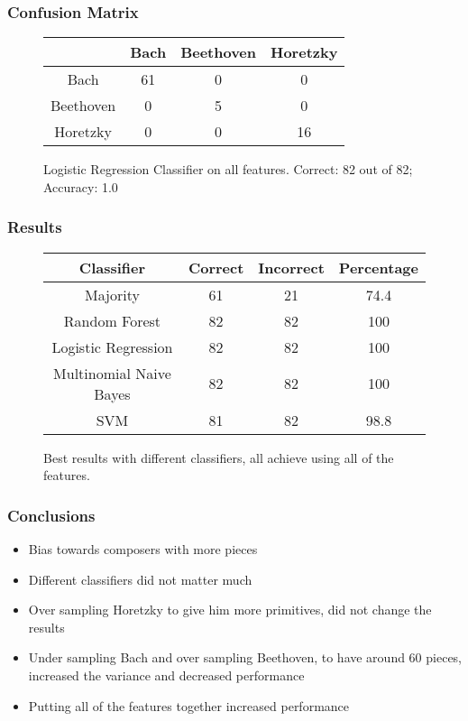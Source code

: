 \documentclass{beamer}
\begin{document}
\begin{frame}
  \frametitle{Confusion Matrix}
  \begin{figure}[!t]
    \begin{center}
      \begin{tabular}{c | c c c}
        & Bach  & Beethoven & Horetzky \\
        \hline
        Bach & 61 & 0 & 0 \\
        Beethoven & 0  & 5 & 0 \\
        Horetzky & 0  & 0 & 16
      \end{tabular}
    \end{center}
    \caption{
      Logistic Regression Classifier on all features.
      Correct: 82 out of 82;
      Accuracy: 1.0
    }
  \end{figure}
\end{frame}


\begin{frame}
  \frametitle{Results}
  \begin{figure}
    \begin{center}
      \begin{tabular}{c || c | c | c }
        Classifier & Correct & Incorrect & Percentage\\
        \hline
        Majority & 61 & 21 & 74.4\\
        Random Forest & 82 & 82 & 100 \\
        Logistic Regression & 82 & 82 & 100\\
        Multinomial Naive Bayes & 82 & 82 & 100\\
        SVM & 81 & 82 & 98.8 \\
      \end{tabular}
    \end{center}
    \caption{Best results with different classifiers, all achieve using all of
      the features.}
  \end{figure}
\end{frame}

\begin{frame}
\frametitle{Conclusions}
\begin{itemize}
  \item Bias towards composers with more pieces
  \item Different classifiers did not matter much
  \item Over sampling Horetzky to give him more primitives, did not change the
    results
  \item Under sampling Bach and over sampling Beethoven, to have around 60
    pieces, increased the variance and decreased performance
  \item Putting all of the features together increased performance
\end{itemize}
\end{frame}
\end{document}
